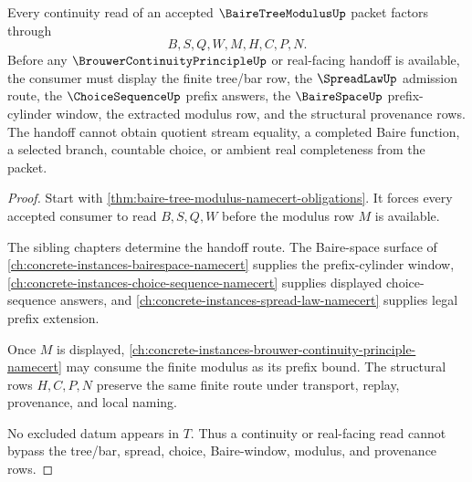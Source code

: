 \begin{theorem}
\label{thm:baire-tree-modulus-continuity-handoff}
Every continuity read of an accepted $\BaireTreeModulusUp$ packet factors through
$$
B,S,Q,W,M,H,C,P,N .
$$
Before any $\BrouwerContinuityPrincipleUp$ or real-facing handoff is available, the consumer must display the finite tree/bar row, the $\SpreadLawUp$ admission route, the $\ChoiceSequenceUp$ prefix answers, the $\BaireSpaceUp$ prefix-cylinder window, the extracted modulus row, and the structural provenance rows. The handoff cannot obtain quotient stream equality, a completed Baire function, a selected branch, countable choice, or ambient real completeness from the packet.
\end{theorem}
\begin{proof}
Start with \autoref{thm:baire-tree-modulus-namecert-obligations}. It forces every accepted consumer to read $B,S,Q,W$ before the modulus row $M$ is available.

The sibling chapters determine the handoff route. The Baire-space surface of \autoref{ch:concrete-instances-bairespace-namecert} supplies the prefix-cylinder window, \autoref{ch:concrete-instances-choice-sequence-namecert} supplies displayed choice-sequence answers, and \autoref{ch:concrete-instances-spread-law-namecert} supplies legal prefix extension.

Once $M$ is displayed, \autoref{ch:concrete-instances-brouwer-continuity-principle-namecert} may consume the finite modulus as its prefix bound. The structural rows $H,C,P,N$ preserve the same finite route under transport, replay, provenance, and local naming.

No excluded datum appears in $T$. Thus a continuity or real-facing read cannot bypass the tree/bar, spread, choice, Baire-window, modulus, and provenance rows.
\end{proof}


